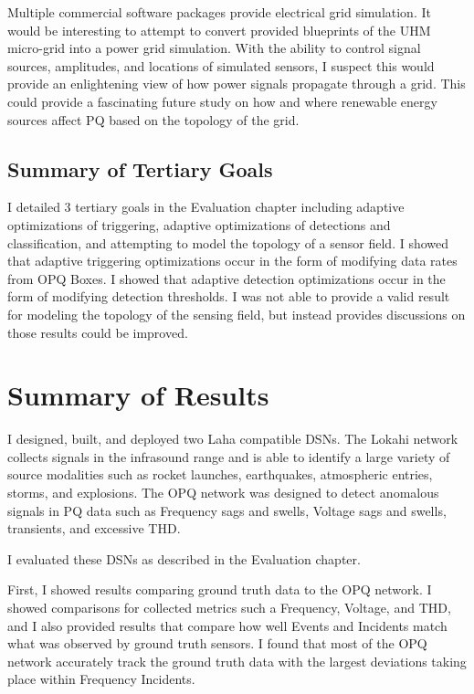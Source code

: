 Multiple commercial software packages provide electrical grid simulation. It would be interesting to attempt to convert provided blueprints of the UHM micro-grid into a power grid simulation. With the ability to control signal sources, amplitudes, and locations of simulated sensors, I suspect this would provide an enlightening view of how power signals propagate through a grid. This could provide a fascinating future study on how and where renewable energy sources affect PQ based on the topology of the grid.

\subsection{Summary of Tertiary Goals}\label{subsec:summary-of-tertiary-goals}

I detailed 3 tertiary goals in the Evaluation chapter including adaptive optimizations of triggering, adaptive optimizations of detections and classification, and attempting to model the topology of a sensor field. I showed that adaptive triggering optimizations occur in the form of modifying data rates from OPQ Boxes. I showed that adaptive detection optimizations occur in the form of modifying detection thresholds. I was not able to provide a valid result for modeling the topology of the sensing field, but instead provides discussions on those results could be improved.

\section{Summary of Results}\label{sec:summary-of-results}

I designed, built, and deployed two Laha compatible DSNs. The Lokahi network collects signals in the infrasound range and is able to identify a large variety of source modalities such as rocket launches, earthquakes, atmospheric entries, storms, and explosions. The OPQ network was designed to detect anomalous signals in PQ data such as Frequency sags and swells, Voltage sags and swells, transients, and excessive THD.

I evaluated these DSNs as described in the Evaluation chapter.

First, I showed results comparing ground truth data to the OPQ network. I showed comparisons for collected metrics such a Frequency, Voltage, and THD, and I also provided results that compare how well Events and Incidents match what was observed by ground truth sensors. I found that most of the OPQ network accurately track the ground truth data with the largest deviations taking place within Frequency Incidents.

